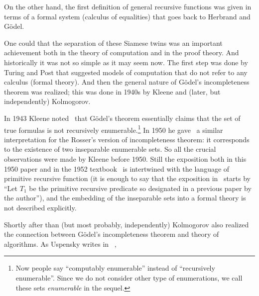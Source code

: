 \documentclass[12pt]{article}
\theoremstyle{remark}
\begin{document}
On the other hand, the first definition of general recursive functions was given in terms of a formal system (calculus of equalities) that goes back to Herbrand and G\"{o}del.

One could that the separation of these Siamese twins was an important achievement both in the theory of computation and in the proof theory. And historically it was not so simple as it may seem now. The first step was done by Turing and Post that suggested models of computation that do not refer to any calculus (formal theory).  And then the general nature of G\"{o}del's incompleteness theorem was realized; this was done in 1940s by Kleene and (later, but independently) Kolmogorov.

In 1943 Kleene noted~\cite{Kleene1943} that G\"odel's theorem essentially claims that the set of true formulas is not recursively enumerable.\footnote{Now people say ``computably enumerable'' instead of ``recursively enumerable''. Since we do not consider other type of enumerations, we call these sets \emph{enumerable} in the sequel.} In 1950 he gave~\cite{Kleene1950} a similar interpretation for the Rosser's version of incompleteness theorem: it corresponds to the existence of two inseparable enumerable sets. So all the crucial observations were made by Kleene before 1950. Still the exposition both in this 1950 paper and in the 1952 textbook~\cite{Kleene1957} is intertwined with the language of primitive recursive function (it is enough to say that the exposition in~\cite{Kleene1950} starts by  ``Let $T_1$ be the primitive recursive predicate so designated in a previous paper by the author''), and the embedding of the inseparable sets into a formal theory is not described explicitly.

Shortly after than (but most probably, independently) Kolmogorov also realized the connection between G\"{o}del's incompleteness theorem and theory of algorithms. As Uspensky writes in ~\cite[p.~323]{2006a},
 
\end{document}
